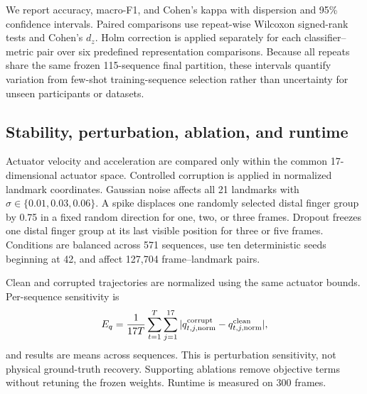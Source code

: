 \documentclass[11pt]{article}
\begin{document}
We report accuracy, macro-F1, and Cohen's kappa with dispersion and 95\% confidence intervals. Paired comparisons use repeat-wise Wilcoxon signed-rank tests and Cohen's $d_z$. Holm correction is applied separately for each classifier--metric pair over six predefined representation comparisons. Because all repeats share the same frozen 115-sequence final partition, these intervals quantify variation from few-shot training-sequence selection rather than uncertainty for unseen participants or datasets.

\begin{table}[t]
\centering
\caption{Frozen downstream-classifier settings.}
\label{tab:classifierparams}
\small

\end{table}

\subsection{Stability, perturbation, ablation, and runtime}
Actuator velocity and acceleration are compared only within the common 17-dimensional actuator space. Controlled corruption is applied in normalized landmark coordinates. Gaussian noise affects all 21 landmarks with $\sigma\in\{0.01,0.03,0.06\}$. A spike displaces one randomly selected distal finger group by 0.75 in a fixed random direction for one, two, or three frames. Dropout freezes one distal finger group at its last visible position for three or five frames. Conditions are balanced across 571 sequences, use ten deterministic seeds beginning at 42, and affect 127,704 frame--landmark pairs.

Clean and corrupted trajectories are normalized using the same actuator bounds. Per-sequence sensitivity is
\begin{equation}
E_q=\frac{1}{17T}\sum_{t=1}^{T}\sum_{j=1}^{17}|q^{\rm corrupt}_{t,j,\rm norm}-q^{\rm clean}_{t,j,\rm norm}|,
\end{equation}
and results are means across sequences. This is perturbation sensitivity, not physical ground-truth recovery. Supporting ablations remove objective terms without retuning the frozen weights. Runtime is measured on 300 frames.

\begin{table}[t]
\centering
\caption{Controlled corruption protocol. Coordinates refer to normalized raw landmarks.}
\label{tab:corruptionprotocol}
\small
\resizebox{\linewidth}{!}{}
\end{table}
\end{document}

